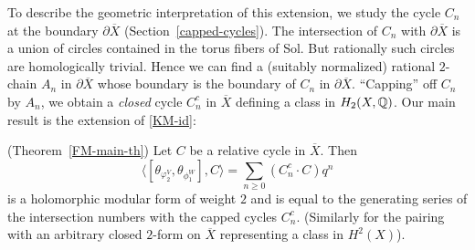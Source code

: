 To describe the geometric interpretation of this extension, we study
the cycle $C_n$ at the boundary $\partial \overline{X}$
(Section~\ref{capped-cycles}). The intersection of $C_n$ with
$\partial \overline{X}$ is a union of circles contained in the torus
fibers of Sol. But rationally such circles are homologically trivial.
Hence we can find a (suitably normalized) rational $2$-chain $A_n$
in $\partial \overline{X}$ whose boundary is the boundary of $C_n$
in $\partial \overline{X}$. ``Capping'' off $C_n$ by $A_n$, we
obtain a {\it closed} cycle $C_n^c$ in $\overline{X}$ defining a
class in $H_2({X},\mathbb{Q})$. Our main result is the extension of
\eqref{KM-id}:
\begin{theorem}\label{FMHZ-main} (Theorem~\ref{FM-main-th})
 Let $C$ be a relative cycle in $\overline{X}$. Then
\[
\langle [\theta_{\varphi^V_{2}}, \theta_{\phi_1^W}], C \rangle  = \sum_{n \geq 0} (C_n^c \cdot C)q^n
\]
is a holomorphic modular form of weight $2$ and is equal to the
generating series of the  intersection numbers with the capped
cycles $C^c_n$. (Similarly for the pairing with an arbitrary closed
$2$-form on $\overline{X}$ representing a class in $H^2(X)$).
\end{theorem}
